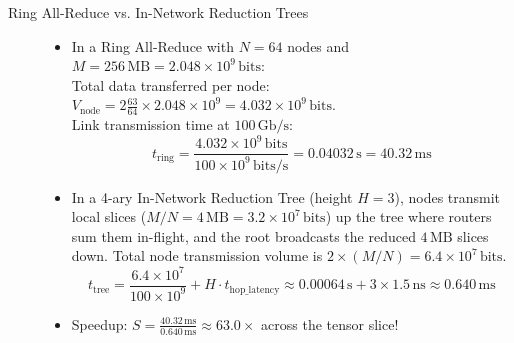 \begin{description}
    \item[Ring All-Reduce vs. In-Network Reduction Trees]
    \begin{itemize}
        \item In a Ring All-Reduce with $N = 64$ nodes and $M = 256\,\mathrm{MB} = 2.048 \times 10^9\,\mathrm{bits}$: \\
        Total data transferred per node: $V_{\mathrm{node}} = 2 \frac{63}{64} \times 2.048 \times 10^9 = 4.032 \times 10^9\,\mathrm{bits}$. \\
        Link transmission time at $100\,\mathrm{Gb/s}$:
        \begin{equation*}
        t_{\mathrm{ring}} = \frac{4.032 \times 10^9\,\mathrm{bits}}{100 \times 10^9\,\mathrm{bits/s}} = \mathbf{0.04032\,\mathrm{s}} = \mathbf{40.32\,\mathrm{ms}}
        \end{equation*}
        \item In a 4-ary In-Network Reduction Tree (height $H = 3$), nodes transmit local slices ($M/N = 4\,\mathrm{MB} = 3.2 \times 10^7\,\mathrm{bits}$) up the tree where routers sum them in-flight, and the root broadcasts the reduced $4\,\mathrm{MB}$ slices down. Total node transmission volume is $2 \times (M/N) = 6.4 \times 10^7\,\mathrm{bits}$.
        \begin{equation*}
        t_{\mathrm{tree}} = \frac{6.4 \times 10^7}{100 \times 10^9} + H \cdot t_{\mathrm{hop\_latency}} \approx 0.00064\,\mathrm{s} + 3 \times 1.5\,\mathrm{ns} \approx \mathbf{0.640\,\mathrm{ms}}
        \end{equation*}
        \item Speedup: $S = \frac{40.32\,\mathrm{ms}}{0.640\,\mathrm{ms}} \approx \mathbf{63.0\times}$ across the tensor slice!
    \end{itemize}


\end{description}
